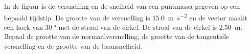 \documentclass{ximera}
\begin{document}
\begin{exercise} 
	In de figuur is de versnelling en de snelheid van een puntmassa gegeven op een bepaald tijdstip. De grootte van de versnelling is \SI{15,0}{\meter\per\second\squared} en de vector maakt een hoek van $\SI{30}{\degree}$ met de straal van de cirkel. De straal van de cirkel is \SI{2,50}{\meter}. Bepaal de grootte van de normaalversnelling, de grootte van de tangentiële versnelling en de grootte van de baansnelheid.
\end{exercise}
\end{document}
